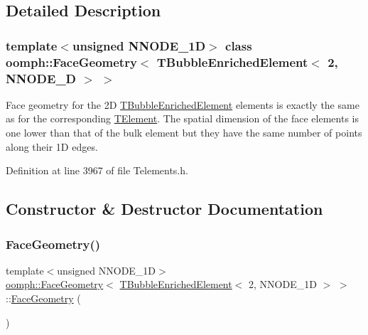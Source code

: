 \subsection{Detailed Description}
\subsubsection*{template$<$unsigned N\+N\+O\+D\+E\+\_\+1D$>$\newline
class oomph\+::\+Face\+Geometry$<$ T\+Bubble\+Enriched\+Element$<$ 2, N\+N\+O\+D\+E\+\_\+D $>$ $>$}

Face geometry for the 2D \hyperlink{classoomph_1_1TBubbleEnrichedElement}{T\+Bubble\+Enriched\+Element} elements is exactly the same as for the corresponding \hyperlink{classoomph_1_1TElement}{T\+Element}. The spatial dimension of the face elements is one lower than that of the bulk element but they have the same number of points along their 1D edges. 

Definition at line 3967 of file Telements.\+h.



\subsection{Constructor \& Destructor Documentation}
\mbox{\label{classoomph_1_1FaceGeometry_3_01TBubbleEnrichedElement_3_012_00_01NNODE__1D_01_4_01_4_af28701fb4dd89fe45fe43f9ad0329606}} 
\subsubsection{\texorpdfstring{Face\+Geometry()}{FaceGeometry()}}
{\footnotesize\ttfamily template$<$unsigned N\+N\+O\+D\+E\+\_\+1D$>$ \\
\hyperlink{classoomph_1_1FaceGeometry}{oomph\+::\+Face\+Geometry}$<$ \hyperlink{classoomph_1_1TBubbleEnrichedElement}{T\+Bubble\+Enriched\+Element}$<$ 2, N\+N\+O\+D\+E\+\_\+1D $>$ $>$\+::\hyperlink{classoomph_1_1FaceGeometry}{Face\+Geometry} (\begin{DoxyParamCaption}{ }\end{DoxyParamCaption})\hspace{0.3cm}{\ttfamily [inline]}}



